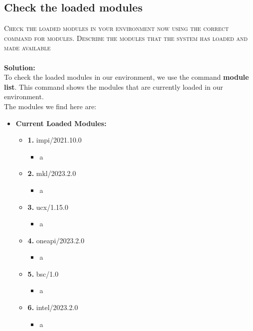 \documentclass{aux}
\begin{document}
\subsection{Check the loaded modules}
\textsc{Check the loaded modules in your environment now using the correct command
for modules. Describe the modules that the system has loaded and made available}\\
\\
\textbf{Solution:}\\
To check the loaded modules in our environment, we use the command \textbf{module list}. This command shows the modules that are currently loaded in our environment.\\
The modules we find here are:
\begin{itemize}
    \item \textbf{Current Loaded Modules:}
    \begin{itemize}
        \item \textbf{1.} impi/2021.10.0
        \begin{itemize}
            \item a
        \end{itemize}
        \item \textbf{2.} mkl/2023.2.0
        \begin{itemize}
            \item  a                                                             
        \end{itemize}
        \item \textbf{3.} ucx/1.15.0
        \begin{itemize}
            \item   a                                                            
        \end{itemize}
        \item \textbf{4.} oneapi/2023.2.0
        \begin{itemize}
            \item    a                                                           
        \end{itemize}
        \item \textbf{5.} bsc/1.0
        \begin{itemize}
            \item     a                                                          
        \end{itemize}
        \item \textbf{6.} intel/2023.2.0
        \begin{itemize}
            \item      a                                                         
        \end{itemize}
        
    \end{itemize}
\end{itemize}
\end{document}
